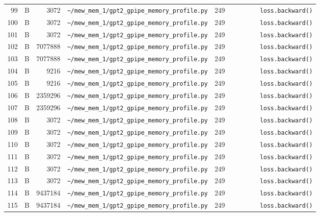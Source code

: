 \documentclass{article}
\begin{document}
\begin{longtable}{r l r p{6.5cm} r p{7.0cm}}
99 & B & 3072 & \lstinline|~/mew_mem_1/gpt2_gpipe_memory_profile.py| & 249 & \lstinline|        loss.backward()| \\
100 & B & 3072 & \lstinline|~/mew_mem_1/gpt2_gpipe_memory_profile.py| & 249 & \lstinline|        loss.backward()| \\
101 & B & 3072 & \lstinline|~/mew_mem_1/gpt2_gpipe_memory_profile.py| & 249 & \lstinline|        loss.backward()| \\
102 & B & 7077888 & \lstinline|~/mew_mem_1/gpt2_gpipe_memory_profile.py| & 249 & \lstinline|        loss.backward()| \\
103 & B & 7077888 & \lstinline|~/mew_mem_1/gpt2_gpipe_memory_profile.py| & 249 & \lstinline|        loss.backward()| \\
104 & B & 9216 & \lstinline|~/mew_mem_1/gpt2_gpipe_memory_profile.py| & 249 & \lstinline|        loss.backward()| \\
105 & B & 9216 & \lstinline|~/mew_mem_1/gpt2_gpipe_memory_profile.py| & 249 & \lstinline|        loss.backward()| \\
106 & B & 2359296 & \lstinline|~/mew_mem_1/gpt2_gpipe_memory_profile.py| & 249 & \lstinline|        loss.backward()| \\
107 & B & 2359296 & \lstinline|~/mew_mem_1/gpt2_gpipe_memory_profile.py| & 249 & \lstinline|        loss.backward()| \\
108 & B & 3072 & \lstinline|~/mew_mem_1/gpt2_gpipe_memory_profile.py| & 249 & \lstinline|        loss.backward()| \\
109 & B & 3072 & \lstinline|~/mew_mem_1/gpt2_gpipe_memory_profile.py| & 249 & \lstinline|        loss.backward()| \\
110 & B & 3072 & \lstinline|~/mew_mem_1/gpt2_gpipe_memory_profile.py| & 249 & \lstinline|        loss.backward()| \\
111 & B & 3072 & \lstinline|~/mew_mem_1/gpt2_gpipe_memory_profile.py| & 249 & \lstinline|        loss.backward()| \\
112 & B & 3072 & \lstinline|~/mew_mem_1/gpt2_gpipe_memory_profile.py| & 249 & \lstinline|        loss.backward()| \\
113 & B & 3072 & \lstinline|~/mew_mem_1/gpt2_gpipe_memory_profile.py| & 249 & \lstinline|        loss.backward()| \\
114 & B & 9437184 & \lstinline|~/mew_mem_1/gpt2_gpipe_memory_profile.py| & 249 & \lstinline|        loss.backward()| \\
115 & B & 9437184 & \lstinline|~/mew_mem_1/gpt2_gpipe_memory_profile.py| & 249 & \lstinline|        loss.backward()| \\

\end{longtable}
\end{document}
